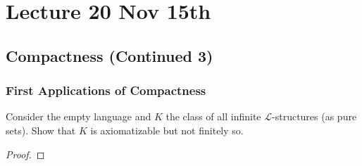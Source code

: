 \documentclass[notoc,notitlepage]{tufte-book}
\begin{document}

\chapter{Lecture 20 Nov 15th}%
\label{chp:lecture_20_nov_15th}

\section{Compactness (Continued 3)}%
\label{sec:compactness_continued_3}

\subsection{First Applications of Compactness}%
\label{sub:first_applications_of_compactness}

\begin{eg}
  Consider the empty language and $K$ the class of all infinite $\mathcal{L}$-structures (as pure sets). Show that $K$ is axiomatizable but not finitely so.
\end{eg}

\begin{proof}
\end{proof}




\appendix

\backmatter\

\pagestyle{plain}



\printindex

\listoftodos
\end{document}
